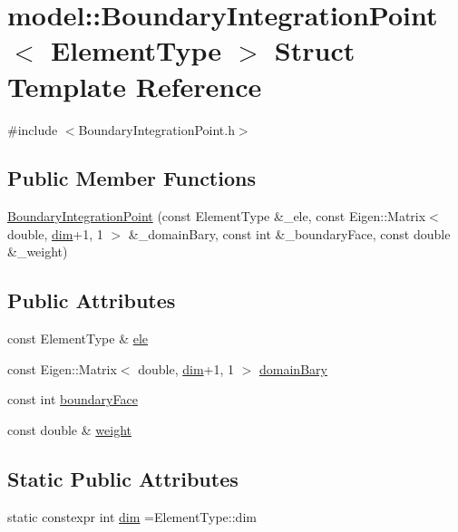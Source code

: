 \hypertarget{structmodel_1_1_boundary_integration_point}{}\section{model\+:\+:Boundary\+Integration\+Point$<$ Element\+Type $>$ Struct Template Reference}
\label{structmodel_1_1_boundary_integration_point}


{\ttfamily \#include $<$Boundary\+Integration\+Point.\+h$>$}

\subsection*{Public Member Functions}
\begin{DoxyCompactItemize}
\item 
\hyperlink{structmodel_1_1_boundary_integration_point_a96f0ed0613c4ce41f3ca2f0f687f61bc}{Boundary\+Integration\+Point} (const Element\+Type \&\+\_\+ele, const Eigen\+::\+Matrix$<$ double, \hyperlink{structmodel_1_1_boundary_integration_point_a1b53c04d801597636f2cb74742916ca5}{dim}+1, 1 $>$ \&\+\_\+domain\+Bary, const int \&\+\_\+boundary\+Face, const double \&\+\_\+weight)
\end{DoxyCompactItemize}
\subsection*{Public Attributes}
\begin{DoxyCompactItemize}
\item 
const Element\+Type \& \hyperlink{structmodel_1_1_boundary_integration_point_a69c5801f95a18a2c3c9bc21bff580a56}{ele}
\item 
const Eigen\+::\+Matrix$<$ double, \hyperlink{structmodel_1_1_boundary_integration_point_a1b53c04d801597636f2cb74742916ca5}{dim}+1, 1 $>$ \hyperlink{structmodel_1_1_boundary_integration_point_a35216a18938e489d23f419d391860829}{domain\+Bary}
\item 
const int \hyperlink{structmodel_1_1_boundary_integration_point_a402b5a2d6ab864ade19f1b4f8444b99b}{boundary\+Face}
\item 
const double \& \hyperlink{structmodel_1_1_boundary_integration_point_a5228be239c0d05260d94cb2b5f3832e5}{weight}
\end{DoxyCompactItemize}
\subsection*{Static Public Attributes}
\begin{DoxyCompactItemize}
\item 
static constexpr int \hyperlink{structmodel_1_1_boundary_integration_point_a1b53c04d801597636f2cb74742916ca5}{dim} =Element\+Type\+::dim
\end{DoxyCompactItemize}


